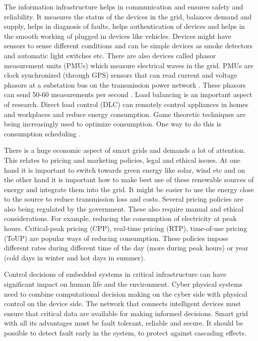 \documentclass[conference]{IEEEtran}[10pt]
\begin{document}
The information infrastructure helps in communication and ensures safety and reliability. 
It measures the status of the devices in the grid, balances demand and supply, helps in diagnosis of faults, helps authentication of devices
and helps in the smooth working of plugged in devices like vehicles. 
Devices might have sensors to sense different conditions and can be simple devices as smoke detectors and automatic light switches etc.
There are also devices called phasor measurement units (PMUs) which measure electrical waves in the grid. 
PMUs are clock synchronized (through GPS) sensors that can read current and voltage phasors at a substation bus on the transmission power network 
\cite{BKAA09}. These phasors can send 50-60 measurements per second \cite{GSA09}. 
Load balancing is an important aspect of research.  
Direct load control (DLC) \cite{RCO09} can remotely control appliances in homes and workplaces and reduce energy consumption. 
Game theoretic techniques are being increasingly used to optimize consumption. 
One way to do this is  consumption scheduling \cite{MWJSL10}.  

There is a huge economic aspect of smart grids and demands a lot of attention. 
This relates to pricing and marketing policies, legal and ethical issues. 
At one hand it is important to switch towards green energy like solar, wind etc and on the other hand it is important how to 
make best use of these renewable sources of energy and integrate them into the grid. 
It might be easier to use the energy close to the source to reduce transmission loss and costs. 
Several pricing policies are also being regulated by the government. These also require manual and ethical considerations. 
For example, reducing the consumption of electricity at peak hours. 
Critical-peak pricing (CPP), real-time pricing (RTP), time-of-use pricing (ToUP) are popular ways of reducing consumption. 
These policies impose different rates during different time  of the day (more during peak hours) or year (cold days in winter and hot days in summer). 

Control decisions of embedded systems in critical infrastructure can have significant impact on human life and the environment. 
Cyber physical systems need to combine computational decision making on the cyber side with physical control on the device side. The network that connects intelligent devices must ensure that critical data are available for making informed decisions. 
Smart grid with all its advantages must be fault tolerant,  reliable and secure. 
It should be possible to detect fault early in the system, to protect against cascading effects. 
\end{document}
